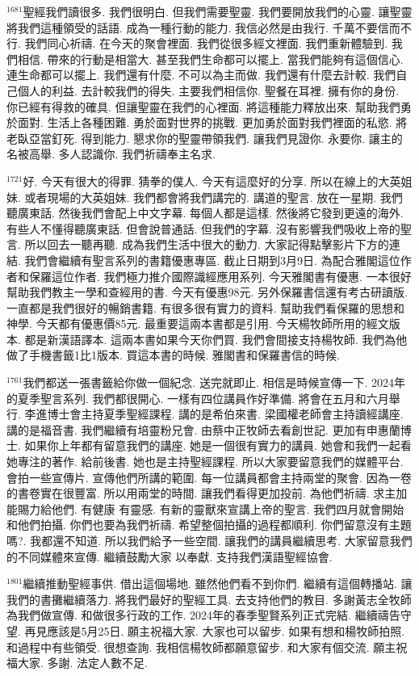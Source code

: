 \documentclass{book}
\begin{document}
$^{1681}$聖經我們讀很多.
我們很明白.
但我們需要聖靈.
我們要開放我們的心靈.
讓聖靈將我們這種領受的話語.
成為一種行動的能力.
我信必然是由我行.
千萬不要信而不行.
我們同心祈禱.
在今天的聚會裡面.
我們從很多經文裡面.
我們重新體驗到.
我們相信.
帶來的行動是相當大.
甚至我們生命都可以擺上.
當我們能夠有這個信心.
連生命都可以擺上.
我們還有什麼.
不可以為主而做.
我們還有什麼去計較.
我們自己個人的利益.
去計較我們的得失.
主要我們相信你.
聖餐在耳裡.
擁有你的身份.
你已經有得救的確具.
但讓聖靈在我們的心裡面.
將這種能力釋放出來.
幫助我們勇於面對.
生活上各種困難.
勇於面對世界的挑戰.
更加勇於面對我們裡面的私慾.
將老臥亞當釘死.
得到能力.
懇求你的聖靈帶領我們.
讓我們見證你.
永要你.
讓主的名被高舉.
多人認識你.
我們祈禱奉主名求.

$^{1721}$好.
今天有很大的得罪.
猜拳的僕人.
今天有這麼好的分享.
所以在線上的大英姐妹.
或者現場的大英姐妹.
我們都會將我們講完的.
講道的聖言.
放在一星期.
我們聽廣東話.
然後我們會配上中文字幕.
每個人都是這樣.
然後將它發到更遠的海外.
有些人不懂得聽廣東話.
但會說普通話.
但我們的字幕.
沒有影響我們吸收上帝的聖言.
所以回去一聽再聽.
成為我們生活中很大的動力.
大家記得點擊影片下方的連結.
我們會繼續有聖言系列的書籍優惠專區.
截止日期到3月9日.
為配合雅閣這位作者和保羅這位作者.
我們極力推介國際識經應用系列.
今天雅閣書有優惠.
一本很好幫助我們教主一學和查經用的書.
今天有優惠98元.
另外保羅書信還有考古研讀版.
一直都是我們很好的暢銷書籍.
有很多很有實力的資料.
幫助我們看保羅的思想和神學.
今天都有優惠價85元.
最重要這兩本書都是引用.
今天楊牧師所用的經文版本.
都是新漢語譯本.
這兩本書如果今天你們買.
我們會間接支持楊牧師.
我們為他做了手機書籤1比1版本.
買這本書的時候.
雅閣書和保羅書信的時候.

$^{1761}$我們都送一張書籤給你做一個紀念.
送完就即止.
相信是時候宣傳一下.
2024年的夏季聖言系列.
我們都很開心.
一樣有四位講員作好準備.
將會在五月和六月舉行.
李進博士會主持夏季聖經課程.
講的是希伯來書.
梁國權老師會主持讀經講座.
講的是福音書.
我們繼續有培靈粉兄會.
由蔡中正牧師去看創世記.
更加有申惠蘭博士.
如果你上年都有留意我們的講座.
她是一個很有實力的講員.
她會和我們一起看她專注的著作.
給前後書.
她也是主持聖經課程.
所以大家要留意我們的媒體平台.
會拍一些宣傳片.
宣傳他們所講的範圍.
每一位講員都會主持兩堂的聚會.
因為一卷的書卷實在很豐富.
所以用兩堂的時間.
讓我們看得更加投前.
為他們祈禱.
求主加能賜力給他們.
有健康 有靈感.
有新的靈獸來宣講上帝的聖言.
我們四月就會開始和他們拍攝.
你們也要為我們祈禱.
希望整個拍攝的過程都順利.
你們留意沒有主題嗎?.
我都還不知道.
所以我們給予一些空間.
讓我們的講員繼續思考.
大家留意我們的不同媒體來宣傳.
繼續鼓勵大家 以奉獻.
支持我們漢語聖經協會.

$^{1801}$繼續推動聖經事供.
借出這個場地.
雖然他們看不到你們.
繼續有這個轉播站.
讓我們的書攤繼續落力.
將我們最好的聖經工具.
去支持他們的教目.
多謝黃志全牧師為我們做宣傳.
和做很多行政的工作.
2024年的春季聖賢系列正式完結.
繼續禱告守望.
再見應該是5月25日.
願主祝福大家.
大家也可以留步.
如果有想和楊牧師拍照.
和過程中有些領受.
很想查詢.
我相信楊牧師都願意留步.
和大家有個交流.
願主祝福大家.
多謝.
法定人數不足.
\newpage
\end{document}
